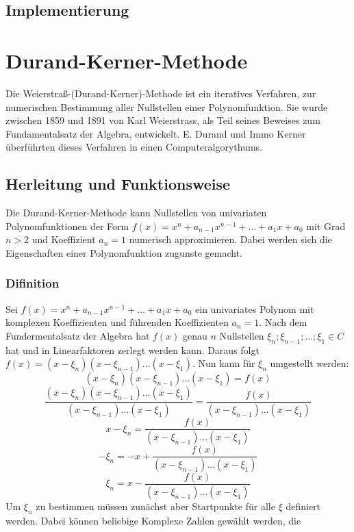 \documentclass[12pt]{article}
\begin{document}
    \subsection{Implementierung}

\section{Durand-Kerner-Methode} 
    Die Weierstraß-(Durand-Kerner)-Methode ist ein iteratives Verfahren, zur numerischen Bestimmung aller Nullstellen einer Polynomfunktion. Sie wurde zwischen 1859 und 1891 von Karl Weierstrass, als Teil seines Beweises zum Fundamentalsatz der Algebra, entwickelt. E. Durand und Immo Kerner überführten dieses Verfahren in einen Computeralgorythums.

    \subsection{Herleitung und Funktionsweise}
        Die Durand-Kerner-Methode kann Nullstellen von univariaten Polynomfunktionen der Form $f(x) = x^n + a_{n-1} x^{n-1} + ... + a_1 x + a_0$ mit Grad $n > 2$ und Koeffizient $a_n = 1$ numerisch approximieren. Dabei werden sich die Eigenschaften einer Polynomfunktion zugunste gemacht.
    \subsubsection{Difinition}
        Sei $f(x) = x^n + a_{n-1} x^{n-1} + ... + a_1 x + a_0$ ein univariates Polynom mit komplexen Koeffizienten und führenden Koeffizienten $a_n = 1$. Nach dem Fundermentalsatz der Algebra hat $f(x)$ genau $n$ Nullstellen $\xi_n;\xi_{n-1};...;\xi_1 \in C$ hat und in Linearfaktoren zerlegt werden kann. Daraus folgt $f(x) = (x - \xi_n)(x - \xi_{n-1})...(x - \xi_1)$. Nun kann für $\xi_n$ umgestellt werden:
        \begin{displaymath}
            (x - \xi_n)(x - \xi_{n-1})...(x - \xi_1) = f(x)
        \end{displaymath}
        \begin{displaymath}
            \frac{(x - \xi_n)(x - \xi_{n-1})...(x - \xi_1)}{(x - \xi_{n-1})...(x - \xi_1)} = \frac{f(x)}{(x - \xi_{n-1})...(x - \xi_1)}
        \end{displaymath}
        \begin{displaymath}
            x - \xi_n = \frac{f(x)}{(x - \xi_{n-1})...(x - \xi_1)}
        \end{displaymath}
        \begin{displaymath}
            - \xi_n = - x + \frac{f(x)}{(x - \xi_{n-1})...(x - \xi_1)}
        \end{displaymath}
        \begin{displaymath}
            \xi_n = x - \frac{f(x)}{(x - \xi_{n-1})...(x - \xi_1)}
        \end{displaymath}
        Um $\xi_n$ zu bestimmen müssen zunächst aber Startpunkte für alle $\xi$ definiert werden. Dabei können beliebige Komplexe Zahlen gewählt werden, die 
\end{document}
